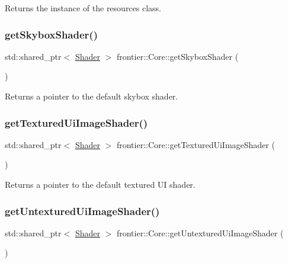 Returns the instance of the resources class. 

\mbox{\label{classfrontier_1_1_core_a0da8b576b0d812148924827da5c05a3d}} 
\subsubsection{\texorpdfstring{get\+Skybox\+Shader()}{getSkyboxShader()}}
{\footnotesize\ttfamily std\+::shared\+\_\+ptr$<$ \hyperlink{classfrontier_1_1_shader}{Shader} $>$ frontier\+::\+Core\+::get\+Skybox\+Shader (\begin{DoxyParamCaption}{ }\end{DoxyParamCaption})}



Returns a pointer to the default skybox shader. 

\mbox{\label{classfrontier_1_1_core_aac07a29176bd8056e004f7be8c919d3f}} 
\subsubsection{\texorpdfstring{get\+Textured\+Ui\+Image\+Shader()}{getTexturedUiImageShader()}}
{\footnotesize\ttfamily std\+::shared\+\_\+ptr$<$ \hyperlink{classfrontier_1_1_shader}{Shader} $>$ frontier\+::\+Core\+::get\+Textured\+Ui\+Image\+Shader (\begin{DoxyParamCaption}{ }\end{DoxyParamCaption})}



Returns a pointer to the default textured UI shader. 

\mbox{\label{classfrontier_1_1_core_a6b61c169b75acd9a15bf3009bc838901}} 
\subsubsection{\texorpdfstring{get\+Untextured\+Ui\+Image\+Shader()}{getUntexturedUiImageShader()}}
{\footnotesize\ttfamily std\+::shared\+\_\+ptr$<$ \hyperlink{classfrontier_1_1_shader}{Shader} $>$ frontier\+::\+Core\+::get\+Untextured\+Ui\+Image\+Shader (\begin{DoxyParamCaption}{ }\end{DoxyParamCaption})}



